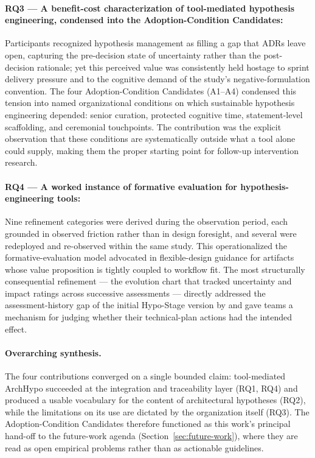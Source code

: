 \paragraph{RQ3 --- A benefit-cost characterization of tool-mediated hypothesis
engineering, condensed into the Adoption-Condition Candidates:} Participants recognized
hypothesis management as filling a gap that ADRs leave open, capturing the
pre-decision state of uncertainty rather than the post-decision rationale; yet
this perceived value was consistently held hostage to sprint delivery pressure
and to the cognitive demand of the study's negative-formulation convention. The four
Adoption-Condition Candidates (A1--A4) condensed this tension into named organizational
conditions on which sustainable hypothesis engineering depended: senior
curation, protected cognitive time, statement-level scaffolding, and
ceremonial touchpoints. The contribution was the explicit observation that
these conditions are systematically outside what a tool alone could supply,
making them the proper starting point for follow-up intervention research.

\paragraph{RQ4 --- A worked instance of formative evaluation for
hypothesis-engineering tools:} Nine refinement categories were derived during
the observation period, each grounded in observed friction rather than in
design foresight, and several were redeployed and re-observed within the same
study. This operationalized the formative-evaluation model advocated in
flexible-design guidance \citep{robson2016} for artifacts whose value
proposition is tightly coupled to workflow fit. The most structurally
consequential refinement --- the evolution chart that tracked uncertainty and
impact ratings across successive assessments --- directly addressed the
assessment-history gap of the initial Hypo-Stage version by \citet{correa2025}
and gave teams a mechanism for judging whether their technical-plan actions
had the intended effect.

\paragraph{Overarching synthesis.} The four contributions converged on a
single bounded claim: tool-mediated ArchHypo succeeded at the integration and
traceability layer (RQ1, RQ4) and produced a usable vocabulary for the
content of architectural hypotheses (RQ2), while the limitations on its use are 
dictated by the organization itself (RQ3). The Adoption-Condition Candidates therefore
functioned as this work's principal hand-off to the future-work agenda
(Section~\ref{sec:future-work}), where they are read as open empirical
problems rather than as actionable guidelines.

